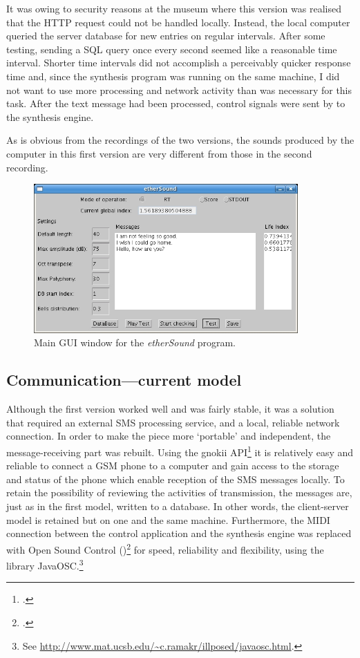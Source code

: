 It was owing to security reasons at the museum where this version was realised that the HTTP request could not be handled locally. Instead, the local computer queried the server database for new entries on regular intervals.  After some testing, sending a SQL query once every second seemed like a reasonable time interval. Shorter time intervals did not accomplish a perceivably quicker response time and, since the synthesis program was running on the same machine, I did not want to use more processing and network activity than was necessary for this task. After the text message had been processed, control signals were sent by  to the synthesis engine. 

As is obvious from the recordings of the two versions, the sounds produced by the computer in this first version are very different from those in the second recording.

\begin{figure}[hbp]
  \begin{center}
    \includegraphics[width=0.9\textwidth]{img/ethsnd/MainGUI}
  \caption{Main GUI window for the \emph{etherSound} program.}
  \label{fig:main_gui}
\end{center}
\end{figure}

\subsection{Communication---current model}
Although the first version worked well and was fairly stable, it was a solution that required an external SMS processing service, and a local, reliable network connection. In order to make the piece more `portable' and independent, the message-receiving part was rebuilt. Using the gnokii API\footcite{gnokii} it is relatively easy and reliable to connect a GSM phone to a computer and gain access to the storage and status of the phone which enable reception of the SMS messages locally. To retain the possibility of reviewing the activities of transmission, the messages are, just as in the first model, written to a database. In other words, the client-server model is retained but on one and the same machine. Furthermore, the MIDI connection between the control application and the synthesis engine was replaced with Open Sound Control ()\footcite{osc, osc_web} for speed, reliability and flexibility, using the library JavaOSC.\footnote{See \url{http://www.mat.ucsb.edu/~c.ramakr/illposed/javaosc.html}.}

